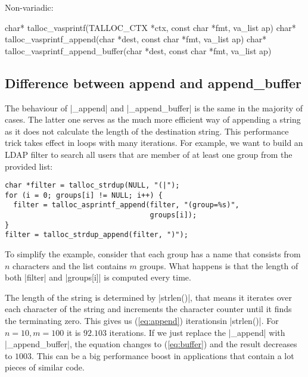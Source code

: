 Non-variadic:
\begin{funcproto}
char* talloc_vasprintf(TALLOC_CTX *ctx, const char *fmt,
                       va_list ap)
char* talloc_vasprintf_append(char *dest, const char *fmt,
                              va_list ap)
char* talloc_vasprintf_append_buffer(char *dest, const char
                                     *fmt, va_list ap)
\end{funcproto}

\subsection{Difference between append and append_buffer}
\label{append-vs-buffer}

The behaviour of |_append| and |_append_buffer| is the same in the majority
of cases. The latter one serves as the much more efficient way of appending a
string as it does not calculate the length of the destination string. This
performance trick takes effect in loops with many iterations. For example, we
want to build an LDAP filter to search all users that are member of at least one
group from the provided list:

\begin{lstlisting}[caption={Appending a string},label={lst:append_buffer}]
char *filter = talloc_strdup(NULL, "(|");
for (i = 0; groups[i] != NULL; i++) {
  filter = talloc_asprintf_append(filter, "(group=%s)",
                                  groups[i]);
}
filter = talloc_strdup_append(filter, ")");
\end{lstlisting}

\noindent
To simplify the example, consider that each group has a name that consists
from $n$ characters and the list contains $m$ groups. What happens is that
the length of both |filter| and |groups[i]| is computed every time.

The length of the string is determined by |strlen()|, that means it iterates
over each character of the string and increments the character counter until it
finds the terminating zero. This gives us (\ref{eq:append})
iterations\footnotemark in |strlen()|. For $n = 10, m = 100$ it is $92.103$
iterations. If we just replace the |_append| with |_append_buffer|, the
equation changes to (\ref{eq:buffer}) and the result decreases to $1003$. This
can be a big performance boost in applications that contain a lot pieces of
similar code.


